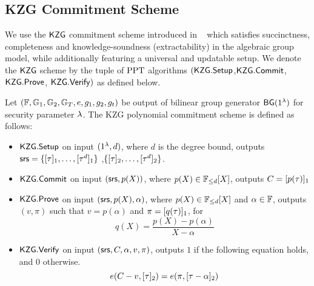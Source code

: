 \subsection{KZG Commitment Scheme}
\label{sec:KZG}
We use the $\mathsf{KZG}$ commitment scheme introduced in ~\cite{AC:KatZavGol10} which satisfies succinctness, completeness and knowledge-soundness (extractability)
in the algebraic group model, while additionally featuring a universal and updatable setup. We denote the $\mathsf{KZG}$ scheme by the tuple
of $\mathrm{PPT}$ algorithms $(\mathsf{KZG.Setup}$,$\mathsf{KZG.Commit}$, $\mathsf{KZG.Prove}$, $\mathsf{KZG.Verify})$ as defined below.
\begin{definition}
	Let $(\mathbb{F},\mathbb{G}_1,\mathbb{G}_2,\mathbb{G}_T, e, g_1, g_2, g_t)$ be output of bilinear group generator $\mathsf{BG}(1^{\lambda})$ for security parameter $\lambda$.
	The KZG polynomial commitment scheme is defined as follows:
	\begin{itemize}[leftmargin=1em]
		\item $\mathsf{KZG.Setup}$ on input $(1^{\lambda},d)$, where $d$ is the degree bound, outputs
		$\mathsf{srs} = \{[\tau]_1,\ldots,[\tau^d]_1\}$ ,$\{[\tau]_2,\ldots,[\tau^d]_2\}$.
		\item $\mathsf{KZG.Commit}$ on input $(\mathsf{srs},p(X))$, where $p(X) \in \mathbb{F}_{\leq d}[X]$, outputs $C=[p(\tau)]_1$
		\item $\mathsf{KZG.Prove}$ on input $(\mathsf{srs},p(X),\alpha)$, where $p(X) \in \mathbb{F}_{\leq d}[X]$ and $\alpha\in \mathbb{F}$, outputs $(v, \pi)$ such that $v=p(\alpha)$ and $\pi=[q(\tau)]_1$, for
		\[ q(X)=\frac{p(X)-p(\alpha)}{X-\alpha} \]
		\item $\mathsf{KZG.Verify}$ on input $(\mathsf{srs},C,\alpha,v,\pi)$, outputs $1$ if the following equation holds, and $0$ otherwise.
		\[ e(C-v, [\tau]_2) = e(\pi, [\tau-\alpha]_2) \]
	\end{itemize}
\end{definition}

